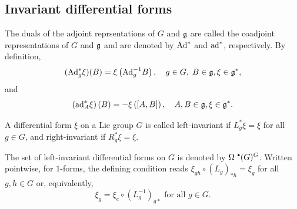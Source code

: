 \subsection{Invariant differential forms}\label{subsec: invariant diff forms}

\begin{defn}
    The duals of the adjoint reprsentations of $G$ and $\mathfrak{g}$ are called the coadjoint representations of $G$ and $\mathfrak{g}$ and are denoted by $\mathrm{Ad}^\ast$ and $\mathrm{ad}^\ast$, respectively. By definition,
    \[(\mathrm{Ad}^\ast_g \xi)(B)=\xi\left(\mathrm{Ad}_g^{-1}B\right),\quad  g\in G,\;B\in\mathfrak{g},\xi\in\mathfrak{g}^\ast,\]
    and 
    \[\left(\mathrm{ad}_A^\ast \xi\right)(B)=-\xi\left([A,B]\right),\quad A,B\in\mathfrak{g},\xi\in\mathfrak{g}^\ast.\]
\end{defn}


\begin{defn}
    A differential form $\xi$ on a Lie group $G$ is called left-invariant if $L_g^\ast\xi =\xi $ for all $g\in G$, and right-invariant if $R_g^\ast\xi=\xi$.

    The set of left-invariant differential forms on $G$ is denoted by $\Omega^{\smbullet }(G)^G$. Written pointwise, for $1$-forms, the defining condition reads $\xi_{gh}\circ (L_g)_{\ast h}=\xi_g$ for all $g,h\in G$ or, equivalently,
    \[\xi_g=\xi_e\circ (L_{g}^{-1})_{g\ast}\text{ for all }g\in G.\label{eq 5.5.1 RS1}\]
\end{defn}

